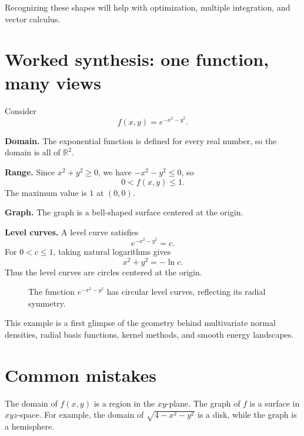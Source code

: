 \documentclass[11pt]{article}
\newcommand{\R}{\mathbb R}
\begin{document}
Recognizing these shapes will help with optimization, multiple integration, and vector calculus.

\section{Worked synthesis: one function, many views}

Consider
\[
f(x,y)=e^{-x^2-y^2}.
\]

\textbf{Domain.} The exponential function is defined for every real number, so the domain is all of $\R^2$.

\textbf{Range.} Since $x^2+y^2\ge 0$, we have $-x^2-y^2\le 0$, so
\[
0<f(x,y)\le 1.
\]
The maximum value is $1$ at $(0,0)$.

\textbf{Graph.} The graph is a bell-shaped surface centered at the origin.

\textbf{Level curves.} A level curve satisfies
\[
e^{-x^2-y^2}=c.
\]
For $0<c\le 1$, taking natural logarithms gives
\[
x^2+y^2=-\ln c.
\]
Thus the level curves are circles centered at the origin.

\begin{figure}[H]
\centering
{}
\caption{The function $e^{-x^2-y^2}$ has circular level curves, reflecting its radial symmetry.}
\end{figure}

This example is a first glimpse of the geometry behind multivariate normal densities, radial basis functions, kernel methods, and smooth energy landscapes.

\section{Common mistakes}

\begin{warningbox}
The domain of $f(x,y)$ is a region in the $xy$-plane. The graph of $f$ is a surface in $xyz$-space. For example, the domain of $\sqrt{4-x^2-y^2}$ is a disk, while the graph is a hemisphere.
\end{warningbox}
\end{document}
